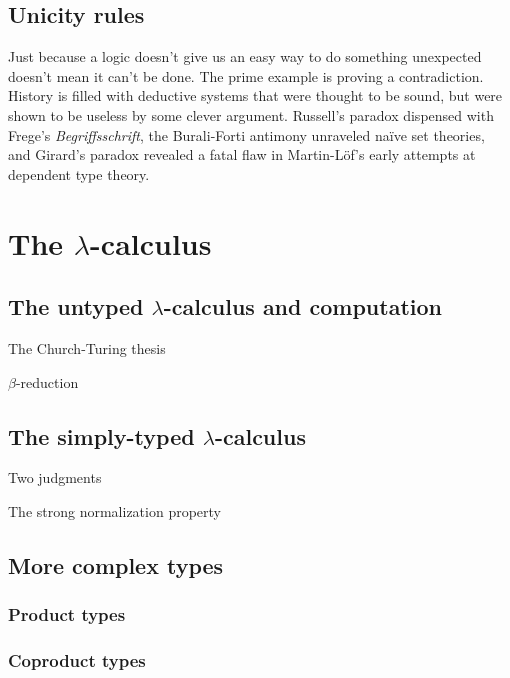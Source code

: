 \documentclass[12pt,twoside,draft]{reedthesis}
\begin{document}
\subsection{Unicity rules}
\label{subsec:ipl-uni}

Just because a logic doesn't give us an easy way to do something unexpected
doesn't mean it can't be done. The prime example is proving a contradiction.
History is filled with deductive systems that were thought to be sound, but
were shown to be useless by some clever argument. Russell's paradox dispensed
with Frege's \textit{Begriffsschrift}, the Burali-Forti antimony unraveled
na\"ive set theories, and Girard's paradox revealed a fatal flaw in
Martin-L\"of's early attempts at dependent type theory.

\section{The $\lambda$-calculus}
\label{sec:the-lambda-calculus}

\subsection{The untyped $\lambda$-calculus and computation}
\label{subsec:the-untyped-lambda-calculus}

The Church-Turing thesis

$\beta$-reduction

\subsection{The simply-typed $\lambda$-calculus}
\label{subsec:the-simply-typed-lambda-calculus}

Two judgments

The strong normalization property

\subsection{More complex types}
\label{subsec:more-complex-types}

\subsubsection{Product types}
\label{subsubsec:product-types}

\subsubsection{Coproduct types}
\label{subsubsec:coproduct-types}
\end{document}

